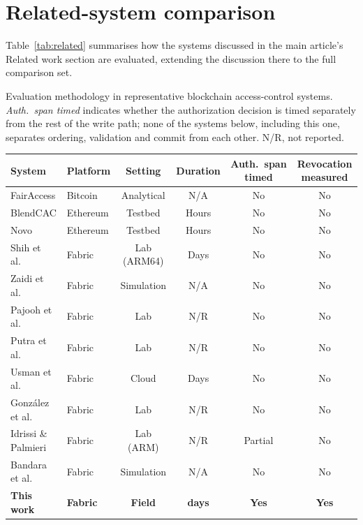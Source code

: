 \section{Related-system comparison}
\label{sec:supp_related}

Table~\ref{tab:related} summarises how the systems discussed in the main
article's Related work section are evaluated, extending the discussion
there to the full comparison set.

\begin{widetab}
\caption{Evaluation methodology in representative blockchain access-control
  systems. \emph{Auth.\ span timed} indicates whether the authorization
  decision is timed separately from the rest of the write path; none of the
  systems below, including this one, separates ordering, validation and
  commit from each other. N/R, not reported.}
\label{tab:related}
\small
\begin{tabularx}{\tblwidth}{@{}l l c c c C@{}}
\toprule
System & Platform & Setting & Duration & Auth.\ span timed & Revocation measured \\
\midrule
FairAccess \cite{ouaddah2016fairaccess}   & Bitcoin  & Analytical & N/A   & No & No \\
BlendCAC \cite{xu2018blendcac}            & Ethereum & Testbed    & Hours & No & No \\
Novo \cite{novo2018blockchain}            & Ethereum & Testbed    & Hours & No & No \\
Shih et al.\ \cite{shih2022iiot}          & Fabric   & Lab (ARM64)& Days  & No & No \\
Zaidi et al.\ \cite{zaidi2023fabrication} & Fabric   & Simulation & N/A   & No & No \\
Pajooh et al.\ \cite{pajooh2022fabric_iot}& Fabric   & Lab        & N/R   & No & No \\
Putra et al.\ \cite{putra2021trust}       & Fabric   & Lab        & N/R   & No & No \\
Usman et al.\ \cite{usman2024blockchain}  & Fabric   & Cloud      & Days  & No & No \\
Gonz\'{a}lez et al.\ \cite{gonzalez2023marketplace} & Fabric & Lab & N/R & No & No \\
Idrissi \& Palmieri \cite{idrissi2024blockchain_jsupercomput}
                                          & Fabric   & Lab (ARM)  & N/R   & Partial & No \\
Bandara et al.\ \cite{bandara2021modeling}& Fabric   & Simulation & N/A   & No & No \\
\textbf{This work}                        & \textbf{Fabric} &
  \textbf{Field} & \textbf{\DeployDays{} days} & \textbf{Yes} & \textbf{Yes} \\
\bottomrule
\end{tabularx}
\end{widetab}

